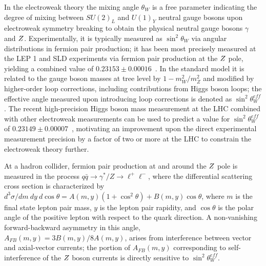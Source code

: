 
In the electroweak theory the mixing angle $\theta_W$ is a free
parameter indicating the degree of mixing between $SU(2)_L$ and
$U(1)_Y$ neutral gauge bosons upon electroweak symmetry breaking to
obtain the physical neutral gauge bosons $\gamma$ and $Z$.
Experimentally, it is typically measured as $\sin^2\theta_W$ via
angular distributions in fermion pair production; it has been most
precisely measured at the LEP 1 and SLD experiments via fermion pair
production at the $Z$ pole, yielding a combined value of
$0.23153\pm0.00016$~\cite{ALEPH:2005ab}. In the standard model it is
related to the gauge boson masses at tree level by $1-m_W^2/m_Z^2$ and
modified by higher-order loop corrections, including contributions
from Higgs boson loops; the effective angle measured upon introducing
loop corrections is denoted as $\sin^2\theta^{eff}_{W}$. The recent
high-precision Higgs boson mass measurement at the LHC combined with
other electroweak measurements can be used to predict a value for
$\sin^2\theta^{eff}_{W}$ of $0.23149 \pm 0.00007$~\cite{Baak:2014ora},
motivating an improvement upon the direct experimental measurement
precision by a factor of two or more at the LHC to constrain the
electroweak theory further.

At a hadron collider, fermion pair production at and around the $Z$
pole is measured in the process
$q\bar{q}\rightarrow \gamma^*/Z \rightarrow \ell^+\ell^-$, where the
differential scattering cross section is characterized by
$d^3\sigma/dm \ dy \ d\cos\theta = A(m,y)(1+\cos^2\theta) +
B(m,y)\cos\theta$, where $m$ is the final state lepton pair mass, $y$
is the lepton pair rapidity, and $\cos\theta$ is the polar angle of
the positive lepton with respect to the quark direction. A
non-vanishing forward-backward asymmetry in this angle, $A_{FB}(m,y) =
3B(m,y)/8A(m,y)$, arises from interference between vector and
axial-vector currents; the portion of $A_{FB}(m,y)$ corresponding to
self-interference of the $Z$ boson currents is directly sensitive to
$\sin^2\theta^{eff}_{W}$.


